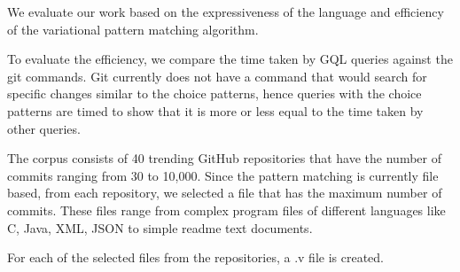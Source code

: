 We evaluate our work based on the expressiveness of the language and efficiency of the variational pattern matching algorithm.

To evaluate the efficiency, we compare the time taken by GQL queries against the git commands. Git currently does not have a command that would search for specific changes similar to the choice patterns, hence queries with the choice patterns are timed to show that it is more or less equal to the time taken by other queries.

The corpus consists of 40 trending GitHub repositories that have the number of commits ranging from 30 to 10,000. Since the pattern matching is currently file based, from each repository, we selected a file that has the maximum number of commits. These files range from complex program files of different languages like C, Java, XML, JSON to simple readme text documents.

For each of the selected files from the repositories, a .v file is created. 

{}
